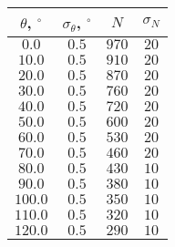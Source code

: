 \begin{tabular}{| c | c | c | c |}
\hline
$\theta$, $^{\circ}$ & $\sigma_{\theta}$, $^{\circ}$ & $N$ & $\sigma_N$\\
\hline
$0.0$ & $0.5$ & $970$ & $20$\\
\hline
$10.0$ & $0.5$ & $910$ & $20$\\
\hline
$20.0$ & $0.5$ & $870$ & $20$\\
\hline
$30.0$ & $0.5$ & $760$ & $20$\\
\hline
$40.0$ & $0.5$ & $720$ & $20$\\
\hline
$50.0$ & $0.5$ & $600$ & $20$\\
\hline
$60.0$ & $0.5$ & $530$ & $20$\\
\hline
$70.0$ & $0.5$ & $460$ & $20$\\
\hline
$80.0$ & $0.5$ & $430$ & $10$\\
\hline
$90.0$ & $0.5$ & $380$ & $10$\\
\hline
$100.0$ & $0.5$ & $350$ & $10$\\
\hline
$110.0$ & $0.5$ & $320$ & $10$\\
\hline
$120.0$ & $0.5$ & $290$ & $10$\\
\hline
\end{tabular}
